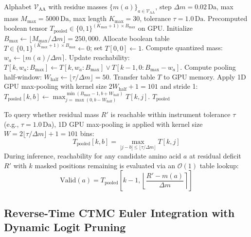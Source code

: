 \begin{algorithm}[!ht]
\caption{KnapsackDP Reachability Precomputation and GPU Pooling}
\label{alg:knapsack_dp}
\begin{algorithmic}[1]
\Require Alphabet $\mathcal{V}_{\text{AA}}$ with residue masses $\{m(a)\}_{a \in \mathcal{V}_{\text{AA}}}$, step $\Delta m = 0.02\,\text{Da}$, max mass $M_{\max} = 5000\,\text{Da}$, max length $K_{\max} = 30$, tolerance $\tau = 1.0\,\text{Da}$.
\Ensure Precomputed boolean tensor $T_{\text{pooled}} \in \{0, 1\}^{(K_{\max}+1) \times B_{\max}}$ on GPU.
\State Initialize $B_{\max} \gets \lfloor M_{\max} / \Delta m \rfloor = 250{,}000$.
\State Allocate boolean table $T \in \{0, 1\}^{(K_{\max}+1) \times B_{\max}} \gets 0$; set $T[0, 0] \gets 1$.
        \State Compute quantized mass: $w_a \gets \lfloor m(a) / \Delta m \rceil$.
        \State Update reachability: $T[k, w_a : B_{\max}] \gets T[k, w_a : B_{\max}] \lor T[k-1, 0 : B_{\max} - w_a]$.
    \EndFor
\EndFor
\State Compute pooling half-window: $W_{\text{half}} \gets \lfloor \tau / \Delta m \rfloor = 50$.
\State Transfer table $T$ to GPU memory.
\State Apply 1D GPU max-pooling with kernel size $2 W_{\text{half}} + 1 = 101$ and stride 1:
\State $T_{\text{pooled}}[k, b] \gets \max_{j = \max(0, b - W_{\text{half}})}^{\min(B_{\max}-1, b + W_{\text{half}})} T[k, j]$.
\State \Return $T_{\text{pooled}}$
\end{algorithmic}
\end{algorithm}

To query whether residual mass $R'$ is reachable within instrument tolerance $\tau$ (e.g., $\tau = 1.0\,\text{Da}$), 1D GPU max-pooling is applied with kernel size $W = 2 \lfloor \tau / \Delta m \rfloor + 1 = 101$ bins:
\begin{equation}
T_{\text{pooled}}[k, b] = \max_{|j - b| \le \lfloor \tau / \Delta m \rfloor} T[k, j]
\label{eq:pooled_reachability}
\end{equation}
During inference, reachability for any candidate amino acid $a$ at residual deficit $R'$ with $k$ masked positions remaining is evaluated via an $\mathcal{O}(1)$ table lookup:
\begin{equation}
\text{Valid}(a) = T_{\text{pooled}}\left[ k-1, \left\lfloor \frac{R' - m(a)}{\Delta m} \right\rceil \right]
\label{eq:reachability_filter}
\end{equation}

\subsection{Reverse-Time CTMC Euler Integration with Dynamic Logit Pruning}
\label{subsec:reverse_euler}

